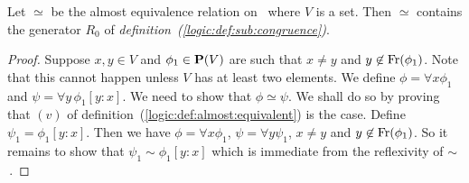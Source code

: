 \begin{prop}\label{logic:prop:almost:contains:r0}
Let $\simeq$ be the almost equivalence relation on \pv\ where $V$ is
a set. Then $\simeq$ contains the generator $R_{0}$ of {\em
definition~(\ref{logic:def:sub:congruence})}.
\end{prop}
\begin{proof}
Suppose $x,y\in V$ and $\phi_{1}\in\mbox{${\bf P}(V)$}$ are such that $x\neq y$ and
$y\not\in\mbox{\rm Fr}(\phi_{1})$. Note that this cannot happen unless $V$
has at least two elements. We define $\phi=\forall x\phi_{1}$ and
$\psi=\forall y\,\phi_{1}[y\!:\!x]$. We need to show that
$\phi\simeq\psi$. We shall do so by proving that $(v)$ of
definition~(\ref{logic:def:almost:equivalent}) is the case. Define
$\psi_{1}=\phi_{1}[y\!:\!x]$. Then we have $\phi=\forall x\phi_{1}$,
$\psi=\forall y\psi_{1}$, $x\neq y$ and $y\not\in\mbox{\rm Fr}(\phi_{1})$.
So it remains to show that $\psi_{1}\sim\phi_{1}[y\!:\!x]$ which is
immediate from the reflexivity of $\sim$\,.
\end{proof}


